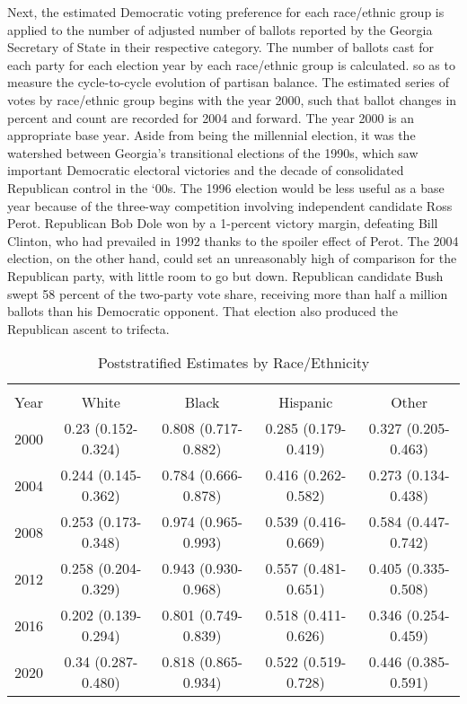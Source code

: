 Next, the estimated Democratic voting preference for each race/ethnic group is applied to the number of adjusted number of ballots reported by the Georgia Secretary of State in their respective category. The number of ballots cast for each party for each election year by each race/ethnic group is calculated. so as to measure the cycle-to-cycle evolution of partisan balance. The estimated series of votes by race/ethnic group begins with the year 2000, such that ballot changes in percent and count are recorded for 2004 and forward. The year 2000 is an appropriate base year. Aside from being the millennial election, it was the watershed between Georgia's transitional elections of the 1990s, which saw important Democratic electoral victories and the decade of consolidated Republican control in the `00s. The 1996 election would be less useful as a base year because of the three-way competition involving independent candidate Ross Perot. Republican Bob Dole won by a 1-percent victory margin, defeating Bill Clinton, who had prevailed in 1992 thanks to the spoiler effect of Perot. The 2004 election, on the other hand, could set an unreasonably high of comparison for the Republican party, with little room to go but down. Republican candidate Bush swept 58 percent of the two-party vote share, receiving more than half a million ballots than his Democratic opponent. That election also produced the Republican ascent to trifecta. 


\begin{table}[ht]
\centering
\caption{Poststratified Estimates by Race/Ethnicity}
\label{tab:mrp-race-est}
\begin{threeparttable}
\begin{tabular}{rcccc}
   \hline \\ \vspace{0.5em}
Year & White & Black & Hispanic & Other \vspace{0.5em} \\
  \hline
2000 & 0.23 (0.152-0.324) & 0.808 (0.717-0.882) & 0.285 (0.179-0.419) & 0.327 (0.205-0.463) \\ 
  2004 & 0.244 (0.145-0.362) & 0.784 (0.666-0.878) & 0.416 (0.262-0.582) & 0.273 (0.134-0.438) \\ 
  2008 & 0.253 (0.173-0.348) & 0.974 (0.965-0.993) & 0.539 (0.416-0.669) & 0.584 (0.447-0.742) \\ 
  2012 & 0.258 (0.204-0.329) & 0.943 (0.930-0.968) & 0.557 (0.481-0.651) & 0.405 (0.335-0.508) \\ 
  2016 & 0.202 (0.139-0.294) & 0.801 (0.749-0.839) & 0.518 (0.411-0.626) & 0.346 (0.254-0.459) \\ 
  2020 & 0.34 (0.287-0.480) & 0.818 (0.865-0.934) & 0.522 (0.519-0.728) & 0.446 (0.385-0.591) \vspace{0.5em} \\ 
   \hline
\end{tabular}
\end{threeparttable}
\end{table}


